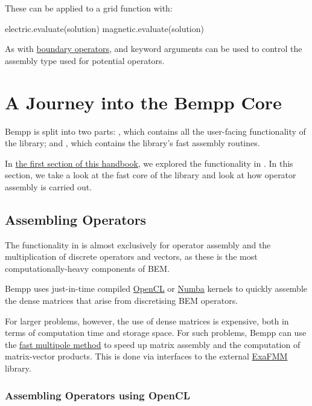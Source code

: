 \documentclass[a4paper]{book}
\begin{document}
These can be applied to a grid function with:
\begin{python}
electric.evaluate(solution)
magnetic.evaluate(solution)
\end{python}

As with \href{maxwell_boundary_operators.md}{boundary operators},  and 
keyword arguments can be used to control the assembly type used for potential operators.


\part{A Journey into the Bempp Core}


Bempp is split into two parts: , which contains all the user-facing functionality
of the library; and , which contains the library's fast assembly routines.

In \href{../api/index.md}{the first section of this handbook}, we explored the functionality
in . In this section, we take a look at the fast core of the library and look at
how operator assembly is carried out.


\chapter{Assembling Operators}

The functionality in  is almost exclusively for operator assembly and the multiplication
of discrete operators and vectors, as these is the most computationally-heavy components of BEM.

Bempp uses just-in-time compiled \href{assembling_opencl.md}{OpenCL} or \href{assembling_numba.md}{Numba}
kernels to quickly assemble the dense matrices that arise from discretising BEM operators.

For larger problems, however, the use of dense matrices is expensive, both in terms of computation
time and storage space. For such problems, Bempp can use the \href{assembling_fmm.md}{fast multipole method}
to speed up matrix assembly and the computation of matrix-vector products. This is done via
interfaces to the external \href{https://github.com/exafmm/exafmm-t}{ExaFMM} library.


\section{Assembling Operators using OpenCL}
\end{document}

